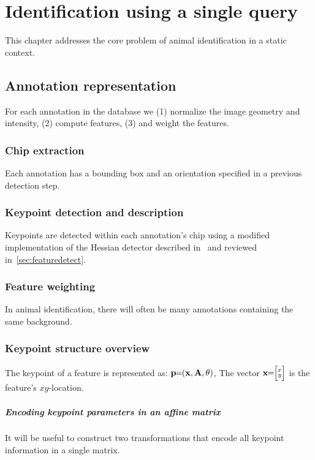 \newcommand{\HypothAffMat}[0]{\hat{\mat{A}}}
\newcommand{\HypothSet}[0]{\set{A}}
\newcommand{\MatchesGroup}[0]{\Matches^{G}}
\newcommand{\AffMat}[0]{\mat{A}}
\newcommand{\AffMatij}[0]{\mat{A}_{i, j}}


\chapter{Identification using a single query}
This chapter addresses the core problem of animal identification in a static context.


\section{Annotation representation}
    For each annotation in the database we
    (1) normalize the image geometry and intensity,
    (2) compute features,
    (3) and weight the features.
    \subsection{Chip extraction}
        Each annotation has a bounding box and an orientation specified in a previous detection step.
        
    \subsection{Keypoint detection and description}
        Keypoints are detected within each annotation's chip using a modified implementation of the Hessian detector
          described in~\cite{perdoch_efficient_2009} and reviewed in~\cref{sec:featuredetect}.
        
    \subsection{Feature weighting}
        In animal identification, there will often be many annotations containing the same background.
        
    \subsection{Keypoint structure overview}
        The keypoint of a feature is represented as:
        $\mathbf{p}\mkern-6mu=\mkern-6mu(\mathbf{x}, \mathbf{A}, \theta)$, %
        The vector $\mathbf{x}\mkern-6mu=\mkern-6mu \Bigl[\negthinspace \begin{smallmatrix}  x\\ y \end{smallmatrix} \negthinspace \Bigr] $ is the feature's $xy$-location.

        \paragraph{Encoding keypoint parameters in an affine matrix}
        It will be useful to construct two transformations that encode all keypoint information in a single matrix.

